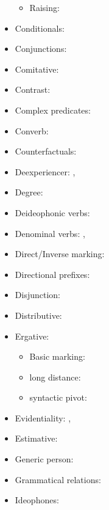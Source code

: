 \documentclass[oldfontcommands,oneside,a4paper,11pt]{article}
\begin{document}
\begin{itemize}
\begin{itemize}
\item  Raising: \citet{jacques15causative}
\end{itemize}
\item Conditionals:  \citet[296-300]{jacques14linking}
\item Conjunctions:  \citet[276-7]{jacques14linking}
\item Comitative: \citet[272-4]{jacques14linking}
\item Contrast:  \citet[315-8]{jacques14linking}
\item Complex predicates: \citet{jacques12incorp}
\item Converb:  \citet[269-272;307-8;321-2]{jacques14linking}
\item Counterfactuals:  \citet[301-2]{jacques14linking}
\item Deexperiencer: \citet[216-7]{jacques12demotion}, \citet{jacques14antipassive}
\item Degree: \citet{jacques16comparative}
\item Deideophonic verbs: \citet[278-282]{japhug14ideophones}
\item Denominal verbs:  \citet{jacques12incorp}, \citet{jacques14antipassive}
\item Direct/Inverse marking: \citet{jacques10inverse}
\item Directional prefixes:  \citet[267-8]{jacques14linking}
\item Disjunction:  \citet[318-9]{jacques14linking}
\item Distributive: \citet{jacques16comparative}
\item Ergative:   \citet{jacques16comparative}
\begin{itemize}
\item Basic marking: \citet[131-2]{jacques10inverse}
\item long distance: \citet[278]{jacques14linking}
\item syntactic pivot:   \citet[208]{jacques12demotion}
\end{itemize}
\item Evidentiality: \citet[380-390]{jacques04these}, \citet{jacques08}
\item Estimative: \citet{jacques13tropative}
\item Generic person:   \citet[204-8]{jacques12demotion}
\item Grammatical relations: \citet{jacques16relatives}
\item Ideophones: \citet{japhug14ideophones}
\begin{itemize}

\end{itemize}
\end{itemize}
\end{document}
